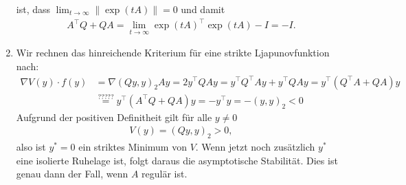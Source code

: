 \begin{solution}
\begin{enumerate}[label = \textbf{\alph*)}]
  ist, dass $\lim_{t \to \infty}\|\exp(tA)\| = 0$ und damit
  \begin{align*}
    A^{\top}Q + QA = \lim_{t \to \infty} \exp(tA)^{\top}\exp(tA) - I = -I.
  \end{align*}
  \item Wir rechnen das hinreichende Kriterium für eine strikte Ljapunovfunktion nach:
  \begin{align*}
    \nabla V(y) \cdot f(y) &= \nabla (Qy,y)_2 Ay = 2y^{\top}Q Ay =
    y^{\top}Q^{\top} Ay + y^{\top}Q Ay = y^{\top}(Q^{\top}A + QA)y \\
    &\stackrel{?????}{=} y^{\top}(A^{\top}Q + QA)y = - y^{\top}y = -(y,y)_2 < 0
  \end{align*}
  Aufgrund der positiven Definitheit gilt für alle $y \neq 0$
  \begin{align*}
    V(y) = (Qy,y)_2 > 0,
  \end{align*}
  also ist $y^* = 0$ ein striktes Minimum von $V$. Wenn jetzt noch zusätzlich $y^*$
  eine isolierte Ruhelage ist, folgt daraus die asymptotische Stabilität.
  Dies ist genau dann der Fall, wenn $A$ regulär ist.
\end{enumerate}
\end{solution}
